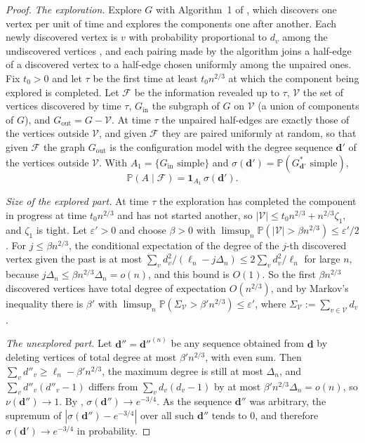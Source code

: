 \documentclass[11pt]{amsart}
\theoremstyle{remark}
\numberwithin{equation}{section}
\newcommand{\PP}{\mathbb{P}}
\begin{document}
\begin{proof}
\emph{The exploration.} Explore $G$ with Algorithm~1 of \cite{DHLS17}, which discovers one vertex per unit of time and explores the components one after another. Each newly discovered vertex is $v$ with probability proportional to $d_v$ among the undiscovered vertices \cite[(5.4)]{DHLS17}, and each pairing made by the algorithm joins a half-edge of a discovered vertex to a half-edge chosen uniformly among the unpaired ones. Fix $t_0>0$ and let $\tau$ be the first time at least $t_0n^{2/3}$ at which the component being explored is completed. Let $\mathcal F$ be the information revealed up to $\tau$, $\mathcal V$ the set of vertices discovered by time $\tau$, $G_{\mathrm{in}}$ the subgraph of $G$ on $\mathcal V$ (a union of components of $G$), and $G_{\mathrm{out}}=G-\mathcal V$. At time $\tau$ the unpaired half-edges are exactly those of the vertices outside $\mathcal V$, and given $\mathcal F$ they are paired uniformly at random, so that given $\mathcal F$ the graph $G_{\mathrm{out}}$ is the configuration model with the degree sequence $\boldsymbol d'$ of the vertices outside $\mathcal V$. With $A_1=\{G_{\mathrm{in}}\text{ simple}\}$ and $\sigma(\boldsymbol d')=\PP(G^*_{\boldsymbol d'}\text{ simple})$,
\begin{equation}\label{eq:condA}
\PP(A\mid\mathcal F)=\mathbf 1_{A_1}\,\sigma(\boldsymbol d').
\end{equation}

\emph{Size of the explored part.} At time $\tau$ the exploration has completed the component in progress at time $t_0n^{2/3}$ and has not started another, so $|\mathcal V|\le t_0n^{2/3}+n^{2/3}\zeta_1$, and $\zeta_1$ is tight. Let $\varepsilon'>0$ and choose $\beta>0$ with $\limsup_n\PP(|\mathcal V|>\beta n^{2/3})\le\varepsilon'/2$. For $j\le\beta n^{2/3}$, the conditional expectation of the degree of the $j$-th discovered vertex given the past is at most $\sum_vd_v^2/(\ell_n-j\Delta_n)\le2\sum_vd_v^2/\ell_n$ for large $n$, because $j\Delta_n\le\beta n^{2/3}\Delta_n=o(n)$, and this bound is $O(1)$. So the first $\beta n^{2/3}$ discovered vertices have total degree of expectation $O(n^{2/3})$, and by Markov's inequality there is $\beta'$ with $\limsup_n\PP(\Sigma_{\mathcal V}>\beta'n^{2/3})\le\varepsilon'$, where $\Sigma_{\mathcal V}:=\sum_{v\in\mathcal V}d_v$.

\emph{The unexplored part.} Let $\boldsymbol d''=\boldsymbol d''^{(n)}$ be any sequence obtained from $\boldsymbol d$ by deleting vertices of total degree at most $\beta'n^{2/3}$, with even sum. Then $\sum_vd''_v\ge\ell_n-\beta'n^{2/3}$, the maximum degree is still at most $\Delta_n$, and $\sum_vd''_v(d''_v-1)$ differs from $\sum_vd_v(d_v-1)$ by at most $\beta'n^{2/3}\Delta_n=o(n)$, so $\nu(\boldsymbol d'')\to1$. By \cite[Corollary~1.5]{Ja09}, $\sigma(\boldsymbol d'')\to e^{-3/4}$. As the sequence $\boldsymbol d''$ was arbitrary, the supremum of $|\sigma(\boldsymbol d'')-e^{-3/4}|$ over all such $\boldsymbol d''$ tends to $0$, and therefore $\sigma(\boldsymbol d')\to e^{-3/4}$ in probability.


\end{proof}
\end{document}
